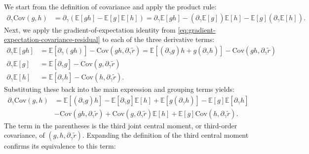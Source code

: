 \documentclass{article}
\begin{document}
We start from the definition of covariance and apply the product rule:
%
\begin{align}
  \partial_{\gamma} \mathrm{Cov}(g, h) & = \partial_{\gamma} \left( \mathbb{E}[g h] - \mathbb{E}[g]\mathbb{E}[h] \right) = \partial_{\gamma} \mathbb{E}[g h] - (\partial_{\gamma} \mathbb{E}[g]) \mathbb{E}[h] - \mathbb{E}[g] (\partial_{\gamma} \mathbb{E}[h]).
\end{align}
%
Next, we apply the gradient-of-expectation identity from \cref{eq:gradient-expectation-covariance-residual} to each of the three derivative terms:
%
\begin{align}
  \partial_{\gamma} \mathbb{E}[g h] & = \mathbb{E}[\partial_{\gamma}(g h)] - \mathrm{Cov}(g h, \partial_{\gamma} \tilde{r}) = \mathbb{E}[(\partial_{\gamma} g) h + g (\partial_{\gamma} h)] - \mathrm{Cov}(g h, \partial_{\gamma} \tilde{r}) \\
  \partial_{\gamma} \mathbb{E}[g]   & = \mathbb{E}[\partial_{\gamma} g] - \mathrm{Cov}(g, \partial_{\gamma} \tilde{r})                                                                                                                       \\
  \partial_{\gamma} \mathbb{E}[h]   & = \mathbb{E}[\partial_{\gamma} h] - \mathrm{Cov}(h, \partial_{\gamma} \tilde{r}).
\end{align}
%
Substituting these back into the main expression and grouping terms yields:
%
\begin{align}
  \partial_{\gamma} \mathrm{Cov}(g, h) & = \mathbb{E}[(\partial_{\gamma} g) h] - \mathbb{E}[\partial_{\gamma} g] \mathbb{E}[h] + \mathbb{E}[g (\partial_{\gamma} h)] - \mathbb{E}[g] \mathbb{E}[\partial_{\gamma} h]           \\
                                       & - \mathrm{Cov}(g h, \partial_{\gamma} \tilde{r}) + \mathrm{Cov}(g, \partial_{\gamma} \tilde{r}) \mathbb{E}[h] + \mathbb{E}[g] \mathrm{Cov}(h, \partial_{\gamma} \tilde{r}). \nonumber
\end{align}
%
The term in the parentheses is the third joint central moment, or third-order covariance, of $(g, h, \partial_{\gamma} \tilde{r})$.
Expanding the definition of the third central moment confirms its equivalence to this term:
%
\end{document}
